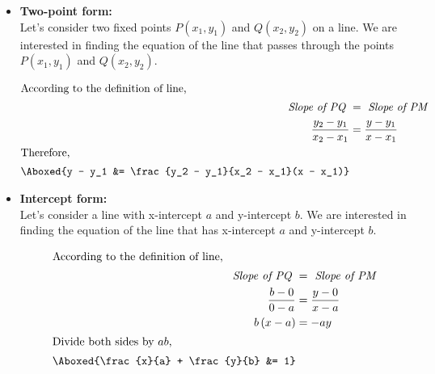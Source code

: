 \begin{itemize}
    \pagebreak
    \item \textbf{Two-point form:}\\[2mm]
    Let's consider two fixed points \( P(x_1, y_1) \) and \( Q(x_2, y_2) \) on a line. We are interested in finding the equation of the line that passes through the points \( P(x_1, y_1) \) and \( Q(x_2, y_2) \).\\[2mm]
        \begin{center}
        \end{center}
        \begin{align*}
            \intertext{According to the definition of line,}
            \textit{Slope of PQ } &= \textit{ Slope of PM} \\
            \frac{y_2 - y_1}{x_2 - x_1} &= \frac{y - y_1}{x - x_1} \\
            \intertext{Therefore,}
            \Aboxed{y - y_1 &= \frac{y_2 - y_1}{x_2 - x_1}(x - x_1)}
        \end{align*}

    \item \textbf{Intercept form:}\\[2mm]
    Let's consider a line with x-intercept \( a \) and y-intercept \( b \). We are interested in finding the equation of the line that has x-intercept \( a \) and y-intercept \( b \).\\[2mm]
        \begin{center}
        \end{center}
        \begin{align*}
            \intertext{According to the definition of line,}
            \textit{Slope of PQ
            } &= \textit{ Slope of PM} \\
            \frac{b - 0}{0 - a} &= \frac{y - 0}{x - a} \\
            b\left(x-a\right) &= -ay \\
            \intertext{Divide both sides by \( ab \),}
            \Aboxed{\frac{x}{a} + \frac{y}{b} &= 1}
        \end{align*}

\end{itemize}